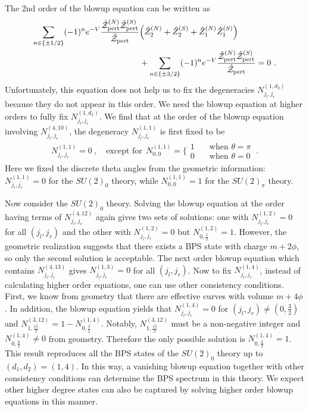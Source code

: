 The 2nd order of the blowup equation can be written as
\begin{align}
\sum_{n \in \{ \pm 1/2 \}} (-1)^n e^{-V} \frac{\hat{\mathcal{Z}}_{\mathrm{pert}}^{(N)} \hat{\mathcal{Z}}_{\mathrm{pert}}^{(S)}}{\hat{\mathcal{Z}}_{\mathrm{pert}}} & \qty( \hat{Z}_2^{(N)} +  \hat{Z}_2^{(S)} +  \hat{Z}_1^{(N)} \hat{Z}_1^{(S)} ) \nonumber \\
& + \sum_{n \in \{\pm 3/2\}} (-1)^n e^{-V} \frac{\hat{\mathcal{Z}}_{\mathrm{pert}}^{(N)} \hat{\mathcal{Z}}_{\mathrm{pert}}^{(S)}}{\hat{\mathcal{Z}}_{\mathrm{pert}}}
= 0 \ .
\end{align}
Unfortunately, this equation does not help us to fix the degeneracies $ N_{j_l, j_r}^{(1, d_2)} $ because they do not appear in this order. We need the blowup equation at higher orders to fully fix $ N_{j_l, j_r}^{(1, d_2)}$. We find that at the order of the blowup equation involving $ N_{j_l, j_r}^{(4, 10)} $, the degeneracy $ N_{j_l, j_r}^{(1, 1)} $ is first fixed to be
\begin{align}
N_{j_l, j_r}^{(1, 1)} =0\ ,\quad\text{except for} ~~
N_{0, 0}^{(1, 1)} = \Bigg\{
\begin{array}{ll}
1 & \quad \text{when~} \theta=\pi \\
0 & \quad \text{when~}\theta=0
\end{array} \ .
\end{align}
Here we fixed the discrete theta angles from the geometric information: $ N_{j_l, j_r}^{(1, 1)} = 0 $ for the $ SU(2)_0 $ theory, while $ N_{0, 0}^{(1, 1)} =1 $ for the $ SU(2)_\pi $ theory. 

Now consider the $ SU(2)_0 $ theory. Solving the blowup equation at the order having terms of $ N_{j_l, j_r}^{(4, 12)} $ again gives two sets of solutions: one with $ N_{j_l, j_r}^{(1, 2)} = 0 $ for all $ (j_l, j_r) $ and the other with $ N_{j_l, j_r}^{(1, 2)} = 0 $ but $ N_{0, \frac{1}{2}}^{(1, 2)} = 1 $. However, the geometric realization suggests that there exists a BPS state with charge $ m + 2\phi $, so only the second solution is acceptable. The next order blowup equation which contains $ N_{j_l, j_r}^{(4, 13)} $ gives $ N_{j_l, j_r}^{(1, 3)} = 0 $ for all $ (j_l, j_r) $. Now to fix $ N_{j_l, j_r}^{(1, 4)} $, instead of calculating higher order equations, one can use other consistency conditions. First, we know from geometry that there are effective curves with volume $ m + 4\phi $. In addition, the blowup equation yields that $ N_{j_l, j_r}^{(1, 4)} = 0 $ for $ (j_l, j_r) \neq (0, \frac{3}{2}) $ and  $N_{1,\frac{15}{2}}^{(3,12)} = 1 - N_{0,\frac{3}{2}}^{(1, 4)} $. Notably, $ N_{1,\frac{15}{2}}^{(3,12)} $ must be a non-negative integer and $ N_{0,\frac{3}{2}}^{(1, 4)} \neq 0 $ from geometry. Therefore the only possible solution is $ N_{0,\frac{3}{2}}^{(1, 4)} = 1 $. This result reproduces all the BPS states of the $SU(2)_0$ theory up to $(d_1,d_2)=(1,4)$. In this way, a vanishing blowup equation together with other consistency conditions can determine the BPS spectrum in this theory. We expect other higher degree states can also be captured by solving higher order blowup equations in this manner. 

